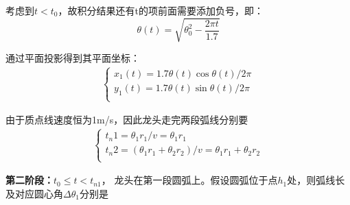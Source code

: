 \documentclass{cumcmthesis1}
\begin{document}
\par
考虑到$t<t_0$，故积分结果还有t的项前面需要添加负号，即：
\begin{equation}
    \theta(t)=\sqrt{\theta_0^2-\frac{2 \pi t}{1.7}}
\end{equation}
\par
通过平面投影得到其平面坐标：
\begin{align}
    \begin{cases}
        x_1(t)=1.7 \theta(t) \cos \theta(t)/2 \pi\\
        y_1(t)=1.7 \theta(t) \sin \theta(t)/2 \pi\\
    \end{cases}
\end{align}
\par
由于质点线速度恒为1m/s，因此龙头走完两段弧线分别要
\begin{align}
    \begin{cases}
        t_n1=\theta_1 r_1/v=\theta_1 r_1\\
        t_n2=(\theta_1 r_1+\theta_2 r_2) /v=\theta_1 r_1+\theta_2 r_2\\
    \end{cases}
\end{align}
\par
\textbf{第二阶段：}$t_0 \leq t<t_{n1}$，
龙头在第一段圆弧上。假设圆弧位于点$h_1$处，则弧线长及对应圆心角$\Delta \theta_1$分别是
\end{document}
